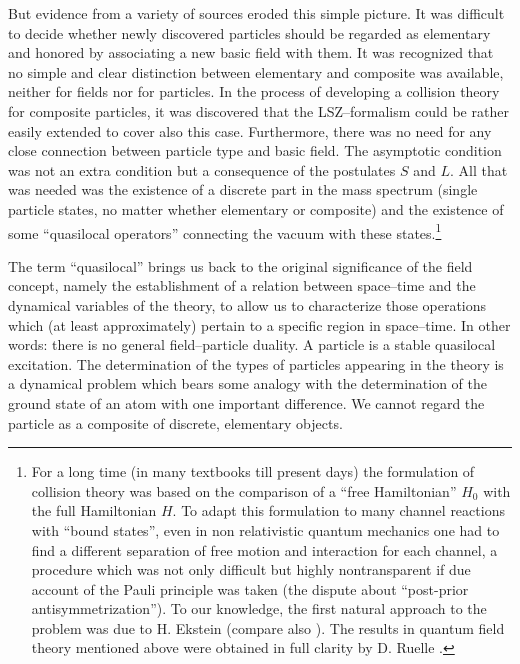 But evidence from a variety of sources eroded this simple picture. It
was difficult to decide whether newly discovered particles should be
regarded as elementary and honored by associating a new basic field
with them. It was recognized that no simple and clear distinction
between elementary and composite was available, neither for fields nor
for particles. In the process of developing a collision theory for
composite particles, it was discovered that the LSZ--formalism could be
rather easily extended to cover also this case. Furthermore, there was
no need for any close connection between particle type and basic
field. The asymptotic condition was not an extra condition but a
consequence of the postulates $S$ and $L$. All that was needed was the
existence of a discrete part in the mass spectrum (single particle
states, no matter whether elementary or composite) and the existence of
some ``quasilocal operators'' connecting the vacuum with these
states.\footnote{For a long time (in many textbooks till present
  days) the formulation of collision theory was based on the
  comparison of a ``free Hamiltonian'' $H_0$ with the full Hamiltonian
  $H$. To adapt this formulation to many channel reactions with
  ``bound states'', even in non relativistic quantum mechanics one had
  to find a different separation of free motion and interaction for
  each channel, a procedure which was
  not only difficult but highly nontransparent if due account of the
  Pauli principle was taken (the dispute about ``post-prior
  antisymmetrization''). To our knowledge, the first natural approach
  to the problem was due to H. Ekstein \cite{Ek} (compare also 
  \cite{Ha1,BrHa}). The results in quantum field theory mentioned
  above were obtained in full clarity by D. Ruelle \cite{Ru}.} 

The term ``quasilocal'' brings us back to the 
original significance of the field concept, namely the establishment
of a relation between space--time and the dynamical variables of the
theory, to allow us to characterize those operations which (at least
approximately) pertain to a specific region in space--time.
In other words: there is no general field--particle duality. A particle
is a stable quasilocal excitation. The determination of the types of
particles appearing in the theory is a dynamical problem which bears
some analogy with the determination of the ground state of an atom
with one important difference. We cannot regard the particle as a
composite of discrete, elementary objects.

